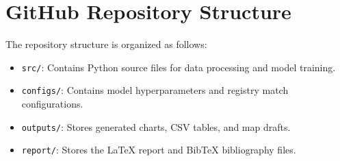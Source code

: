 \documentclass[12pt,a4paper]{report}
\begin{document}
\chapter{GitHub Repository Structure}
The repository structure is organized as follows:
\begin{itemize}
    \item \texttt{src/}: Contains Python source files for data processing and model training.
    \item \texttt{configs/}: Contains model hyperparameters and registry match configurations.
    \item \texttt{outputs/}: Stores generated charts, CSV tables, and map drafts.
    \item \texttt{report/}: Stores the LaTeX report and BibTeX bibliography files.
\end{itemize}
\end{document}
